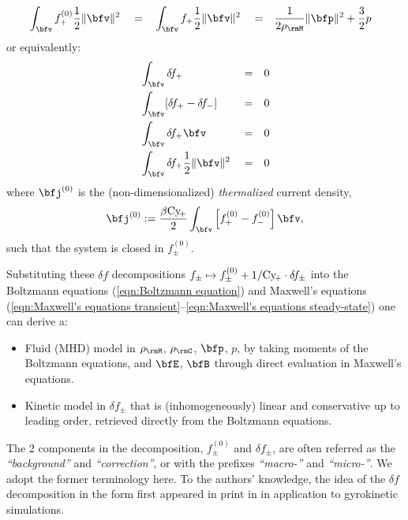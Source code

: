 \begin{definition}
\begin{align}
            &\int_{\bfv}f_{+}^{(0)}\frac{1}{2}\|\bfv\|^{2}      &  &=  &  &\int_{\bfv}f_{+}\frac{1}{2}\|\bfv\|^{2}  &  &=  &  \frac{1}{2\rho_{\rmM}}\|\bfp\|^{2} + \frac{3}{2}&p
        \end{align}
        or equivalently:
        \begin{align}
            &\int_{\bfv}\delta\!f_{+}                         &  &=  &  0  \label{eqn:correction mass moment}  \\
            &\int_{\bfv}[\delta\!f_{+} - \delta\!f_{-}]       &  &=  &  0  \\
            &\int_{\bfv}\delta\!f_{+}\bfv                     &  &=  &  0  \\
            &\int_{\bfv}\delta\!f_{+}\frac{1}{2}\|\bfv\|^{2}  &  &=  &  0  \label{eqn:correction energy moment}
        \end{align}
        where $\bfj^{(0)}$ is the (non-dimensionalized) \emph{thermalized} current density,
        \begin{equation}\label{eqn:thermalized current density}
            \bfj^{(0)}  :=  \frac{\beta\rmCy\!_{+}}{2}\int_{\bfv}\left[f_{+}^{(0)} - f_{-}^{(0)}\right]\bfv,
        \end{equation}
        such that the system is closed in $f_{\pm}^{(0)}$.

        Substituting these $\delta\!f$ decompositions $f_{\pm}  \mapsto  f_{\pm}^{(0)} + 1/\mathrm{Cy}\!_{+}\cdot\delta\!f_{\pm}$ into the Boltzmann equations (\ref{eqn:Boltzmann equation}) and Maxwell's equations (\ref{eqn:Maxwell's equations transient}--\ref{eqn:Maxwell's equations steady-state}) one can derive a:
        \begin{itemize}
            \item  Fluid (MHD) model in $\rho_{\rmM}$, $\rho_{\rmC}$, $\bfp$, $p$, by taking moments of the Boltzmann equations, and $\bfE$, $\bfB$ through direct evaluation in Maxwell's equations.
            \item  Kinetic model in $\delta\!f_{\pm}$ that is (inhomogeneously) linear and conservative up to leading order, retrieved directly from the Boltzmann equations.
        \end{itemize}
    \end{definition}
    
    The 2 components in the decomposition, $f_{\pm}^{(0)}$ and $\delta\!f_{\pm}$, are often referred as the \emph{``background''} and \emph{``correction''}, or with the prefixes \emph{``macro-''} and \emph{``micro-''}. We adopt the former terminology here. To the authors' knowledge, the idea of the $\delta\!f$ decomposition in the form first appeared in print in \cite{Parker_Lee_1993, Dimits_Lee_1993} in application to gyrokinetic simulations.

